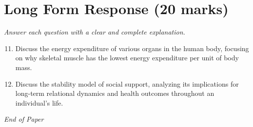 \documentclass[12pt]{article}
\begin{document}
\section*{Long Form Response (20 marks)}
\textit{Answer each question with a clear and complete explanation.}
\begin{enumerate}[label=\arabic*.]
\setcounter{enumi}{10}
\item Discuss the energy expenditure of various organs in the human body, focusing on why skeletal muscle has the lowest energy expenditure per unit of body mass.
\item Discuss the stability model of social support, analyzing its implications for long-term relational dynamics and health outcomes throughout an individual's life.
\end{enumerate}

\vfill
\noindent\textit{End of Paper}
\end{document}
